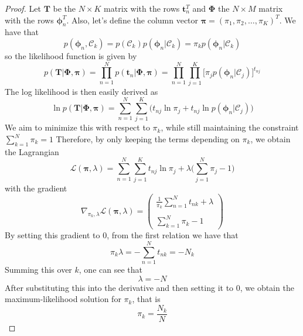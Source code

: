 \vspace{1em}

\begin{proof}
    Let $\mathbf{T}$ be the $N \times K$ matrix with the rows $\mathbf{t}_n^T$ and
    $\mathbf{\Phi}$ the $N \times M$ matrix with the rows $\bm{\phi}_n^T$.
    Also, let's define the column vector $\bm{\pi} = (\pi_1, \pi_2, \ldots, \pi_K)^T$.
    We have that
    \[
        p(\bm{\phi}_n, \mathcal{C}_k)
        = p(\mathcal{C}_k)p(\bm{\phi}_n | \mathcal{C}_k)
        = \pi_k p(\bm{\phi}_n | \mathcal{C}_k)
    \] 
    so the likelihood function is given by
    \[
        p(\mathbf{T} | \mathbf{\Phi}, \bm{\pi})
        = \prod_{n = 1}^N p(\mathbf{t}_n | \mathbf{\Phi}, \bm{\pi})
        = \prod_{n = 1}^N \prod_{j = 1}^K
        \bigg[\pi_j p(\bm{\phi}_n | \mathcal{C}_j)\bigg]^{t_{nj}}
    \] 
    The log likelihood is then easily derived as
    \[
        \ln p(\mathbf{T} | \mathbf{\Phi}, \bm{\pi})
        = \sum_{n=1}^{N} \sum_{j=1}^{K} \bigg(t_{nj} \ln \pi_j
        + t_{nj} \ln p(\bm{\phi}_n | \mathcal{C}_j)\bigg)
    \] 
    We aim to minimize this with respect to $\pi_k$, while
    still maintaining the constraint $\sum_{k=1}^{N} \pi_k = 1$
    Therefore, by only keeping the terms depending on $\pi_k$, we obtain the Lagrangian
    \[
        \mathcal{L}(\bm{\pi}, \lambda)
        = \sum_{n=1}^{N} \sum_{j=1}^{K} t_{nj} \ln \pi_j
        + \lambda \bigg(\sum_{j=1}^{N} \pi_j - 1\bigg)
    \]
    with the gradient
    \[
        \nabla_{\pi_k, \lambda} \mathcal{L}(\bm{\pi}, \lambda)
        = \begin{pmatrix}
            \displaystyle \frac{1}{\pi_k} \sum_{n=1}^{N} t_{nk} + \lambda \\
            \\
            \displaystyle \sum_{k=1}^{N} \pi_k - 1
        \end{pmatrix}
    \] 
    By setting this gradient to $0$, from the first relation we have that
    \[
        \pi_k\lambda = -\sum_{n=1}^{N} t_{nk} = -N_k
    \] 
    Summing this over $k$, one can see that
     \[
         \lambda = -N
    \] 
    After substituting this into the derivative and then setting it to 0, 
    we obtain the maximum-likelihood solution for $\pi_k$, that is
    \[
        \pi_k = \frac{N_k}{N}
    \] 
\end{proof}

